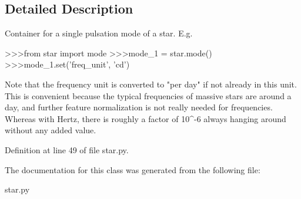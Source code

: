 \subsection{Detailed Description}
\begin{DoxyVerb}Container for a single pulsation mode of a star. E.g. 

>>>from star import mode
>>>mode_1 = star.mode()
>>>mode_1.set('freq_unit', 'cd')

Note that the frequency unit is converted to "per day" if not already in this unit. This is convenient
because the typical frequencies of massive stars are around a day, and further feature normalization
is not really needed for frequencies. Whereas with Hertz, there is roughly a factor of 10^{-6} always
hanging around without any added value.
\end{DoxyVerb}
 

Definition at line 49 of file star.\+py.



The documentation for this class was generated from the following file\+:\begin{DoxyCompactItemize}
\item 
star.\+py\end{DoxyCompactItemize}
